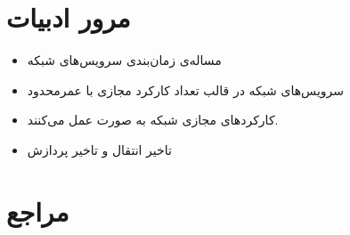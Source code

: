 \documentclass{beamer}
\makeatletter
\newcommand{\RTList}{\raggedleft\rightskip\@totalleftmargin}
\makeatother
\begin{document}
\begin{persian}
	\section{مرور ادبیات}

	\begin{frame}{\cite{Qu2016}}
		\begin{itemize}\RTList{}
			\justifying
			\item مساله‌ی زمان‌بندی سرویس‌های شبکه
			\item سرویس‌های شبکه در قالب تعداد کارکرد مجازی با عمرمحدود
			\item کارکردهای مجازی شبکه به صورت  عمل می‌کنند.
			\item تاخیر انتقال و تاخیر پردازش
		\end{itemize}
	\end{frame}


	\section{مراجع}

	\begin{frame}{}
		\begin{latin}
		\printbibliography%
		\end{latin}
	\end{frame}

\end{persian}
\end{document}
